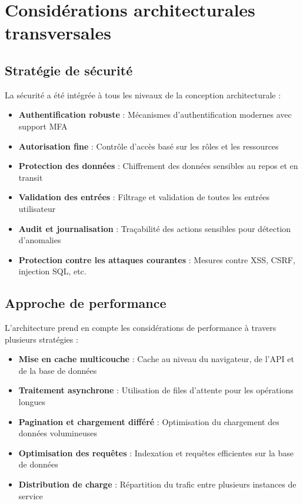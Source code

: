 \section{Considérations architecturales transversales}

\subsection{Stratégie de sécurité}

La sécurité a été intégrée à tous les niveaux de la conception architecturale :

\begin{itemize}
  \item \textbf{Authentification robuste} : Mécanismes d'authentification modernes avec support MFA
  
  \item \textbf{Autorisation fine} : Contrôle d'accès basé sur les rôles et les ressources
  
  \item \textbf{Protection des données} : Chiffrement des données sensibles au repos et en transit
  
  \item \textbf{Validation des entrées} : Filtrage et validation de toutes les entrées utilisateur
  
  \item \textbf{Audit et journalisation} : Traçabilité des actions sensibles pour détection d'anomalies
  
  \item \textbf{Protection contre les attaques courantes} : Mesures contre XSS, CSRF, injection SQL, etc.
\end{itemize}

\subsection{Approche de performance}

L'architecture prend en compte les considérations de performance à travers plusieurs stratégies :

\begin{itemize}
  \item \textbf{Mise en cache multicouche} : Cache au niveau du navigateur, de l'API et de la base de données
  
  \item \textbf{Traitement asynchrone} : Utilisation de files d'attente pour les opérations longues
  
  \item \textbf{Pagination et chargement différé} : Optimisation du chargement des données volumineuses
  
  \item \textbf{Optimisation des requêtes} : Indexation et requêtes efficientes sur la base de données
  
  \item \textbf{Distribution de charge} : Répartition du trafic entre plusieurs instances de service
\end{itemize}

